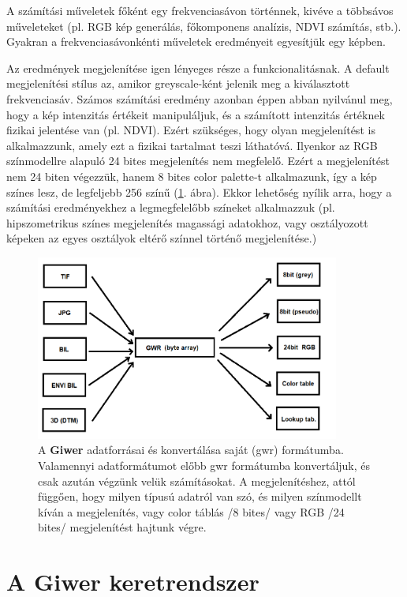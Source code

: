 \documentclass[a4paper,12pt]{article}
\begin{document}
A számítási műveletek főként egy frekvenciasávon történnek, kivéve a többsávos műveleteket (pl. RGB kép generálás, főkomponens analízis, NDVI számítás, stb.). Gyakran a frekvenciasávonkénti műveletek eredményeit egyesítjük egy képben. 

Az eredmények megjelenítése igen lényeges része a funkcionalitásnak. A default megjelenítési stílus az, amikor greyscale-ként jelenik meg a kiválasztott frekvenciasáv. Számos számítási eredmény azonban éppen abban nyilvánul meg, hogy a kép intenzitás értékeit manipuláljuk, és a számított intenzitás értéknek fizikai jelentése van (pl. NDVI). Ezért szükséges, hogy olyan megjelenítést is alkalmazzunk, amely ezt a fizikai tartalmat teszi láthatóvá. Ilyenkor az RGB színmodellre alapuló 24 bites megjelenítés nem megfelelő. Ezért a megjelenítést nem 24 biten végezzük, hanem 8 bites color palette-t alkalmazunk, így a kép színes lesz, de legfeljebb 256 színű (\ref{fig:gwr1}. ábra). Ekkor lehetőség nyílik arra, hogy a számítási eredményekhez a legmegfelelőbb színeket alkalmazzuk (pl. hipszometrikus színes megjelenítés magassági adatokhoz, vagy osztályozott képeken az egyes osztályok eltérő színnel történő megjelenítése.)

\begin{figure}[h]
	\centering
	\includegraphics[width=10cm]{gwr1.png}
	\caption{A \textbf{Giwer} adatforrásai és konvertálása saját (gwr) formátumba. Valamennyi adatformátumot előbb gwr formátumba konvertáljuk, és csak azután végzünk velük számításokat. A megjelenítéshez, attól függően, hogy milyen típusú adatról van szó, és milyen színmodellt kíván a megjelenítés, vagy color táblás /8 bites/ vagy RGB /24 bites/ megjelenítést hajtunk végre.}
	\label{fig:gwr1}
\end{figure} 


\section{A Giwer keretrendszer}
\end{document}
